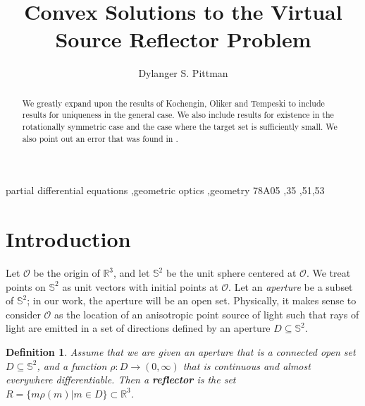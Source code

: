 \documentclass[review]{elsarticle}
\begin{document}
\newcommand{\R}{\mathbb{R}}
\newcommand{\origin}{\mathcal{O}}
\newcommand{\sphere}{\mathbb{S}}

\newtheorem{Def}{Definition}[section]
\newtheorem{claim}{Claim}[section]
\newtheorem{lemma}{Lemma}[section]
\newtheorem{prop}{Proposition}[section]
\newtheorem{conj}{Conjecture}[section]
\newtheorem{theorem}{Theorem}[section]
\newtheorem{coro}{Corollary}[section]

\begin{frontmatter}

\title{Convex Solutions to the Virtual Source Reflector Problem}

\author{Dylanger S. Pittman}
\address{400 Dowman Drive, Atlanta}



\begin{abstract}
We greatly expand upon the results of Kochengin, Oliker and Tempeski \cite{KOT} to include results for uniqueness in the general case. We also include results for existence in the rotationally symmetric case and the case where the target set is sufficiently small. We also point out an error that was found in \cite{KOT}.
\end{abstract}

\begin{keyword}
 partial differential equations \sep geometric optics \sep geometry
\MSC[2020] 78A05 \sep  35 \sep 51\sep 53
\end{keyword}

\end{frontmatter}



\section{Introduction}



Let $\origin$ be the origin of $\R^3$, and let $\sphere^2$ be the unit sphere centered at $\origin$. We treat points on $\sphere^2$ as unit vectors with initial points at $\origin.$ Let an {\it aperture} be a subset of $\sphere^2$; in our work, the aperture will be an open set. Physically, it makes sense to consider $\origin$ as the location of an anisotropic point source of light such that rays of light are emitted in a set of directions defined by an aperture $D\subseteq \sphere^2$.

\begin{Def}\label{reflectorDef}
    Assume that we are given an aperture that is a connected open set $D\subseteq \sphere^2$, and a function $\rho:D\to (0,\infty)$ that is continuous and almost everywhere differentiable. Then a {\bf reflector} is the set $R=\{m\rho(m)|m\in D\}\subset \R^3$. 
\end{Def}
\end{document}
